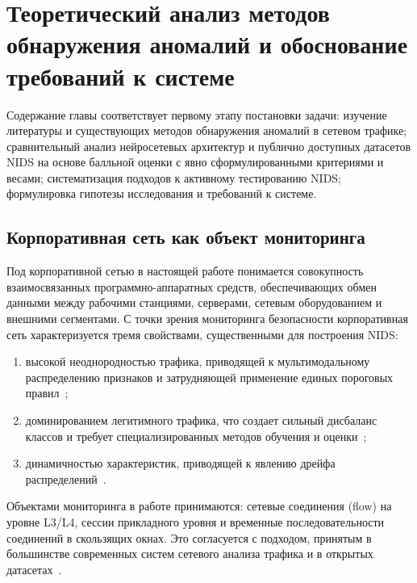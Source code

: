 \section{Теоретический анализ методов обнаружения аномалий и обоснование требований к системе}
\label{ch:theory}

\noindent
Содержание главы соответствует первому этапу постановки задачи:
изучение литературы и существующих методов обнаружения аномалий
в сетевом трафике; сравнительный анализ нейросетевых архитектур
и публично доступных датасетов NIDS на основе балльной оценки с
явно сформулированными критериями и весами; систематизация
подходов к активному тестированию NIDS; формулировка гипотезы
исследования и требований к системе.

\subsection{Корпоративная сеть как объект мониторинга}

Под корпоративной сетью в настоящей работе понимается совокупность
взаимосвязанных программно-аппаратных средств, обеспечивающих обмен
данными между рабочими станциями, серверами, сетевым оборудованием
и внешними сегментами. С точки зрения мониторинга безопасности
корпоративная сеть характеризуется тремя свойствами, существенными
для построения NIDS:

\begin{enumerate}
    \item высокой неоднородностью трафика, приводящей к
    мультимодальному распределению признаков и затрудняющей
    применение единых пороговых правил~\cite{khraisat2019survey,
    ahmad2021nids};
    \item доминированием легитимного трафика, что создает сильный
    дисбаланс классов и требует специализированных методов обучения
    и оценки~\cite{sommer2010outside, chawla2002smote, lin2017focal};
    \item динамичностью характеристик, приводящей к явлению дрейфа
    распределений~\cite{gama2014drift, andresini2021insomnia}.
\end{enumerate}

Объектами мониторинга в работе принимаются: сетевые соединения
(flow) на уровне L3/L4, сессии прикладного уровня и временные
последовательности соединений в скользящих окнах. Это согласуется
с подходом, принятым в большинстве современных систем сетевого
анализа трафика и в открытых датасетах~\cite{moustafa2015unsw,
sharafaldin2018toward}.

